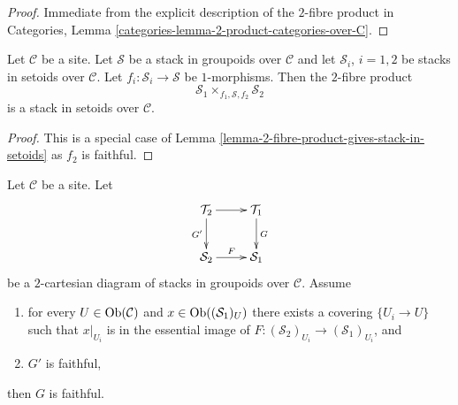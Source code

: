\begin{proof}
Immediate from the explicit description of the $2$-fibre product in
Categories, Lemma \ref{categories-lemma-2-product-categories-over-C}.
\end{proof}

\begin{lemma}
\label{lemma-2-fibre-product-stacks-in-setoids-over-stack-in-groupoids}
Let $\mathcal{C}$ be a site.
Let $\mathcal{S}$ be a stack in groupoids over $\mathcal{C}$ and
let $\mathcal{S}_i$, $i = 1, 2$ be stacks in setoids over $\mathcal{C}$.
Let $f_i : \mathcal{S}_i \to \mathcal{S}$ be $1$-morphisms.
Then the $2$-fibre product
$$
\mathcal{S}_1 \times_{f_1, \mathcal{S}, f_2} \mathcal{S}_2
$$
is a stack in setoids over $\mathcal{C}$.
\end{lemma}

\begin{proof}
This is a special case of
Lemma \ref{lemma-2-fibre-product-gives-stack-in-setoids}
as $f_2$ is faithful.
\end{proof}

\begin{lemma}
\label{lemma-faithful-descent}
Let $\mathcal{C}$ be a site. Let
$$
\xymatrix{
\mathcal{T}_2 \ar[r] \ar[d]_{G'} & \mathcal{T}_1 \ar[d]^G \\
\mathcal{S}_2 \ar[r]^F & \mathcal{S}_1
}
$$
be a $2$-cartesian diagram of stacks in groupoids over $\mathcal{C}$.
Assume
\begin{enumerate}
\item for every $U \in \mathop{\mathrm{Ob}}\nolimits(\mathcal{C})$ and
$x \in \mathop{\mathrm{Ob}}\nolimits((\mathcal{S}_1)_U)$ there exists a covering
$\{U_i \to U\}$ such that $x|_{U_i}$ is in the essential
image of $F : (\mathcal{S}_2)_{U_i} \to (\mathcal{S}_1)_{U_i}$, and
\item $G'$ is faithful,
\end{enumerate}
then $G$ is faithful.
\end{lemma}


